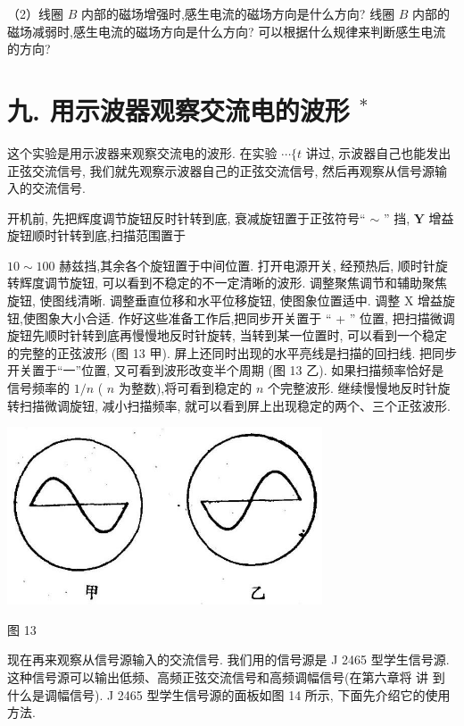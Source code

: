 \documentclass[10pt]{article}
\begin{document}
（2）线圈 \(B\) 内部的磁场增强时,感生电流的磁场方向是什么方向? 线圈 \(B\) 内部的磁场减弱时,感生电流的磁场方向是什么方向? 可以根据什么规律来判断感生电流的方向?

\section*{九. 用示波器观察交流电的波形 \({}^{ * }\)}

这个实验是用示波器来观察交流电的波形. 在实验 \(\cdots \{ t\) 讲过, 示波器自己也能发出正弦交流信号, 我们就先观察示波器自己的正弦交流信号, 然后再观察从信号源输入的交流信号.

开机前, 先把辉度调节旋钮反时针转到底, 衰减旋钮置于正弦符号“ \(\sim\) ” 挡, \(\mathbf{Y}\) 增益旋钮顺时针转到底,扫描范围置于

\({10} \sim {100}\) 赫兹挡,其余各个旋钮置于中间位置. 打开电源开关, 经预热后, 顺时针旋转辉度调节旋钮, 可以看到不稳定的不一定清晰的波形. 调整聚焦调节和辅助聚焦旋钮, 使图线清晰. 调整垂直位移和水平位移旋钮, 使图象位置适中. 调整 \(\mathrm{X}\) 增益旋钮,使图象大小合适. 作好这些准备工作后,把同步开关置于 “ + ” 位置, 把扫描微调旋钮先顺时针转到底再慢慢地反时针旋转, 当转到某一位置时, 可以看到一个稳定的完整的正弦波形 (图 13 甲). 屏上还同时出现的水平亮线是扫描的回扫线. 把同步开关置于“一”位置, 又可看到波形改变半个周期 (图 13 乙). 如果扫描频率恰好是 信号频率的 \(1/n\) ( \(n\) 为整数),将可看到稳定的 \(n\) 个完整波形. 继续慢慢地反时针旋转扫描微调旋钮, 减小扫描频率, 就可以看到屏上出现稳定的两个、三个正弦波形.

\begin{center}
\includegraphics[max width=0.7\textwidth]{images/01913056-1f15-74d8-9184-9aab52c9d66b_386_128917.jpg}
\end{center}

图 13

现在再来观察从信号源输入的交流信号. 我们用的信号源是 J 2465 型学生信号源. 这种信号源可以输出低频、高频正弦交流信号和高频调幅信号(在第六章将 讲 到什么是调幅信号). J 2465 型学生信号源的面板如图 14 所示, 下面先介绍它的使用方法.
\end{document}
